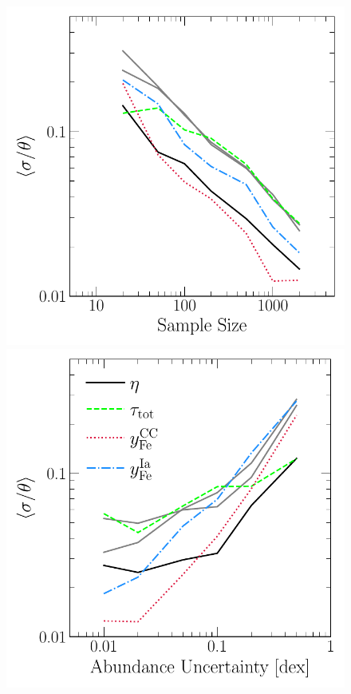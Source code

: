 \documentclass[ms.tex]{subfiles}
\begin{document}
\begin{figure}
\centering
\includegraphics[scale = 0.52]{precision_samplesize.pdf}
\includegraphics[scale = 0.52]{precision_abundanceuncertainty.pdf}

\end{figure}
\end{document}
